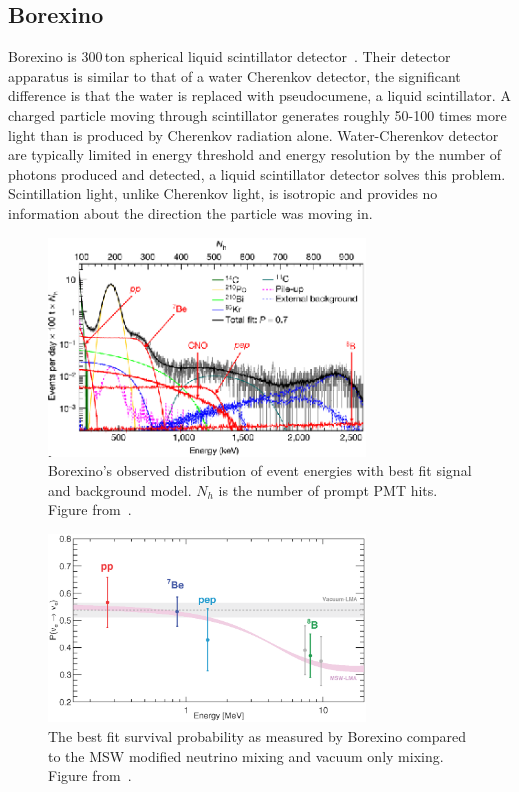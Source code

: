 \subsection{Borexino}
Borexino is 300\,ton spherical liquid scintillator detector~\citep{borexino_tdr}. Their detector
apparatus is similar to that of a water Cherenkov detector, the significant difference
is that the water is replaced with pseudocumene, a liquid scintillator.
A charged particle moving through scintillator generates roughly 50-100 times
more light than is produced by Cherenkov radiation alone.
Water-Cherenkov detector are typically limited in energy threshold
and energy resolution by the number of photons produced and detected, a liquid scintillator
detector solves this problem.  Scintillation light, unlike Cherenkov light,
is isotropic and provides no information about the direction the particle
was moving in.
\begin{figure}[htbp]
    \centering
    \includegraphics[width=0.75\textwidth]{borexino_spectrum}
    \caption[Borexino Spectrum] {Borexino's observed distribution of event energies with best fit
    signal and background model.
    $N_{h}$ is the number of prompt PMT hits.  Figure from~\citep{borexino_nature}.} %
\label{fig:borexino_spectrum}
\end{figure}
\begin{figure}[htbp]
    \centering
    \includegraphics[width=0.75\textwidth]{borexino_pee}
    \caption[Borexino Survival Probability] {The best fit survival probability
    as measured by Borexino compared to the MSW modified neutrino mixing
    and vacuum only mixing. Figure from~\citep{borexino_nature}.}
\label{fig:borexino_pee}
\end{figure}

